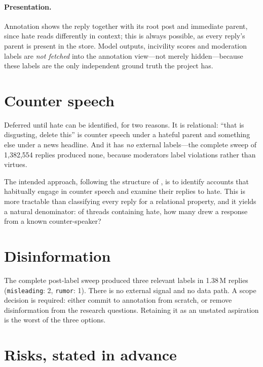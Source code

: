 \documentclass[11pt,a4paper]{article}
\begin{document}
\paragraph{Presentation.} Annotation shows the reply together with its root post and
immediate parent, since hate reads differently in context; this is always possible,
as every reply's parent is present in the store. Model outputs, incivility scores and
moderation labels are \emph{not fetched} into the annotation view---not merely
hidden---because these labels are the only independent ground truth the project has.

\section{Counter speech}

Deferred until hate can be identified, for two reasons. It is relational: ``that is
disgusting, delete this'' is counter speech under a hateful parent and something else
under a news headline. And it has \emph{no} external labels---the complete sweep of
1{,}382{,}554 replies produced none, because moderators label violations rather than
virtues.

The intended approach, following the structure of \cite{garland2020impact}, is to
identify accounts that habitually engage in counter speech and examine their replies
to hate. This is more tractable than classifying every reply for a relational
property, and it yields a natural denominator: of threads containing hate, how many
drew a response from a known counter-speaker?

\section{Disinformation}
\label{sec:disinfo}

The complete post-label sweep produced three relevant labels in 1.38\,M replies
(\texttt{misleading}: 2, \texttt{rumor}: 1). There is no external signal and no data
path. A scope decision is required: either commit to annotation from scratch, or
remove disinformation from the research questions. Retaining it as an unstated
aspiration is the worst of the three options.

\section{Risks, stated in advance}
\end{document}
